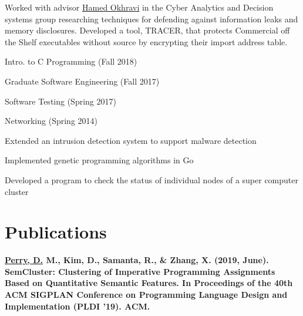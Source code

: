 \documentclass[]{deedy-resume-openfont}
\begin{document}
\begin{minipage}[t]{0.66\textwidth}
\vspace{.05in} %
Worked with advisor \href{https://www.ll.mit.edu/biographies/hamed-okhravi}{Hamed Okhravi}
in the Cyber Analytics and Decision systems group
researching techniques for defending against information leaks and memory disclosures.
Developed a tool, TRACER, that protects Commercial off the Shelf executables without
source by encrypting their import address table.
\sectionsep

\begin{tightemize}
	\item Intro. to C Programming (Fall 2018) 
	\item Graduate Software Engineering (Fall 2017)
	\item Software Testing (Spring 2017)
	\item Networking (Spring 2014)
\end{tightemize}
\sectionsep

\begin{tightemize}
	\item Extended an intrusion detection system to support malware detection
	\item Implemented genetic programming algorithms in Go
	\item Developed a program to check the status of individual nodes of a super computer cluster
\end{tightemize}
\sectionsep


\section{Publications}

{\fontsize{10pt}{12pt}\selectfont\bfseries \underline{Perry, D.} M., Kim, D., Samanta, R., \& Zhang, X. (2019, June). 
SemCluster: Clustering of Imperative Programming
Assignments Based on Quantitative Semantic Features. In Proceedings of the 40th ACM SIGPLAN Conference on Programming
Language Design and Implementation (PLDI ’19). ACM.}


\end{minipage}
\end{document}
